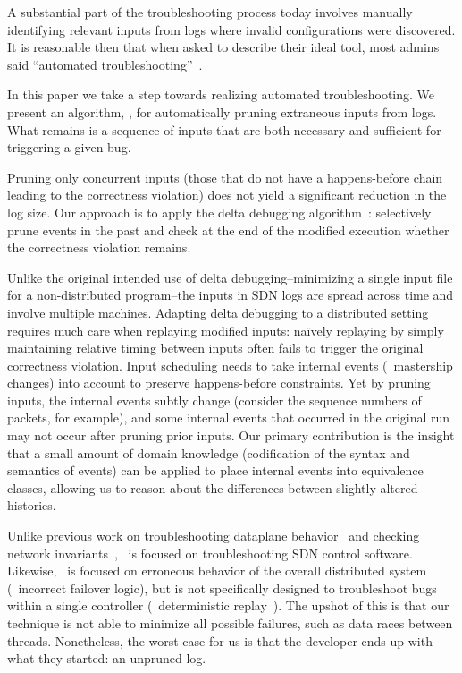 A substantial part of the troubleshooting process today involves manually
identifying relevant inputs
from logs where invalid configurations
were discovered. It is reasonable then that when asked to describe their
ideal tool, most admins said ``automated troubleshooting''~\cite{Zeng:Survey}.

In this paper we take a step towards realizing automated troubleshooting.
We present an algorithm, \simulator, for automatically pruning extraneous
inputs from logs. What remains is a sequence of inputs that are both necessary and sufficient for
triggering a given bug.

Pruning only concurrent inputs (those that do not have a
happens-before chain~\cite{Lamport:1978:TCO:359545.359563} leading to the correctness violation)
does not yield a significant reduction in the log size. Our approach is
to apply the delta debugging algorithm~\cite{Zeller:2002:SIF:506201.506206}:
selectively prune events in the past and check at the end of
the modified execution whether the correctness violation remains.

Unlike the original intended use of delta debugging--minimizing a single
input file for a non-distributed program--the inputs in SDN logs are spread across
time and involve multiple machines. Adapting delta debugging to a distributed
setting requires much care when replaying modified inputs:
na\"ively replaying by simply maintaining relative timing between inputs often
fails to trigger the original correctness
violation. Input scheduling
needs to take internal events (\eg~mastership changes) into account to
preserve happens-before constraints. Yet by pruning inputs, the internal events
subtly change (consider the sequence numbers of packets, for example),
and some internal events that occurred in the original
run may not occur after pruning prior inputs.
Our primary contribution is the insight that a small amount of domain knowledge
(codification of the syntax and semantics of events) can be applied to
place internal events into equivalence classes, allowing us to reason about the
differences between slightly altered histories.

Unlike previous work on troubleshooting dataplane behavior~\cite{handigol2012debugger}
and checking network invariants~\cite{hsa,anteater}, \simulator~is focused on troubleshooting
SDN control software.
Likewise, \simulator~is focused on erroneous
behavior of the overall distributed system (\eg~incorrect
failover logic), but is not specifically designed to troubleshoot bugs within a single controller
(\cf~deterministic replay~\cite{Dunlap:2002:REI:844128.844148}). The upshot of
this is that our technique is not able to minimize all possible failures, such as
data races between threads. Nonetheless, the worst case for us is that the developer ends up with what they started:
an unpruned log.

